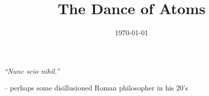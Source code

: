 \documentclass[a4paper, 11pt, oneside]{Thesis}  %
\begin{document}
\frontmatter      %

\title  {The Dance of Atoms}
\addresses  {\groupname\\\deptname\\\univname}  %
\date       {\today}
\subject    {}
\keywords   {}

\maketitle


\fancyhead{}  %
\rhead{\thepage}  %
\lhead{}  %

\pagestyle{fancy}  %

\pagestyle{empty}  %

\null\vfill
\textit{``Nunc scio nihil.''}

\begin{flushright}
-- perhaps some disillusioned Roman philosopher in his 20's
\end{flushright}

\vfill\vfill\vfill\vfill\vfill\vfill\null
\clearpage  %
\end{document}
